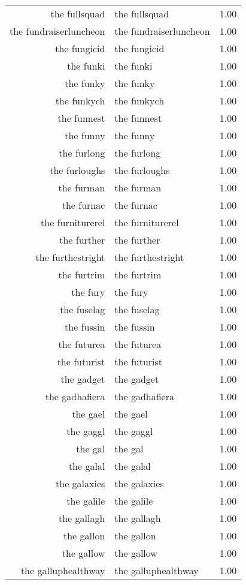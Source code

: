 \begin{table}[ht]
\begin{tabular}{rlr}
  the fullsquad & the fullsquad & 1.00 \\ 
  the fundraiserluncheon & the fundraiserluncheon & 1.00 \\ 
  the fungicid & the fungicid & 1.00 \\ 
  the funki & the funki & 1.00 \\ 
  the funky & the funky & 1.00 \\ 
  the funkych & the funkych & 1.00 \\ 
  the funnest & the funnest & 1.00 \\ 
  the funny & the funny & 1.00 \\ 
  the furlong & the furlong & 1.00 \\ 
  the furloughs & the furloughs & 1.00 \\ 
  the furman & the furman & 1.00 \\ 
  the furnac & the furnac & 1.00 \\ 
  the furniturerel & the furniturerel & 1.00 \\ 
  the further & the further & 1.00 \\ 
  the furthestright & the furthestright & 1.00 \\ 
  the furtrim & the furtrim & 1.00 \\ 
  the fury & the fury & 1.00 \\ 
  the fuselag & the fuselag & 1.00 \\ 
  the fussin & the fussin & 1.00 \\ 
  the futurea & the futurea & 1.00 \\ 
  the futurist & the futurist & 1.00 \\ 
  the gadget & the gadget & 1.00 \\ 
  the gadhafiera & the gadhafiera & 1.00 \\ 
  the gael & the gael & 1.00 \\ 
  the gaggl & the gaggl & 1.00 \\ 
  the gal & the gal & 1.00 \\ 
  the galal & the galal & 1.00 \\ 
  the galaxies & the galaxies & 1.00 \\ 
  the galile & the galile & 1.00 \\ 
  the gallagh & the gallagh & 1.00 \\ 
  the gallon & the gallon & 1.00 \\ 
  the gallow & the gallow & 1.00 \\ 
  the galluphealthway & the galluphealthway & 1.00 \\ 

\end{tabular}
\end{table}
